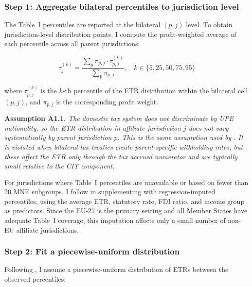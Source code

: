 \documentclass[11pt,a4paper]{article}
\newcommand{\assumption}[2]{\noindent\textbf{Assumption #1.} \textit{#2}\medskip}
\begin{document}
\subsubsection{Step 1: Aggregate bilateral percentiles to jurisdiction level}

The Table~I percentiles are reported at the bilateral $(p, j)$ level. To obtain jurisdiction-level distribution points, I compute the profit-weighted average of each percentile across all parent jurisdictions:

\begin{equation}\label{eq:jurisdiction_percentile}
\tau_j^{(k)} = \frac{\sum_p \pi_{p,j} \cdot \tau_{p,j}^{(k)}}{\sum_p \pi_{p,j}}, \quad k \in \{5, 25, 50, 75, 95\}
\end{equation}

where $\tau_{p,j}^{(k)}$ is the $k$-th percentile of the ETR distribution within the bilateral cell $(p, j)$, and $\pi_{p,j}$ is the corresponding profit weight.

\assumption{A1.1}{The domestic tax system does not discriminate by UPE nationality, so the ETR distribution in affiliate jurisdiction $j$ does not vary systematically by parent jurisdiction $p$. This is the same assumption used by \citet{hugger2025}. It is violated when bilateral tax treaties create parent-specific withholding rates, but these affect the ETR only through the tax accrued numerator and are typically small relative to the CIT component.}

For jurisdictions where Table~I percentiles are unavailable or based on fewer than 20 MNE subgroups, I follow \citet{hugger2025} in supplementing with regression-imputed percentiles, using the average ETR, statutory rate, FDI ratio, and income group as predictors. Since the EU-27 is the primary setting and all Member States have adequate Table~I coverage, this imputation affects only a small number of non-EU affiliate jurisdictions.

\subsubsection{Step 2: Fit a piecewise-uniform distribution}

Following \citet{hugger2025}, I assume a piecewise-uniform distribution of ETRs between the observed percentiles:
\end{document}
